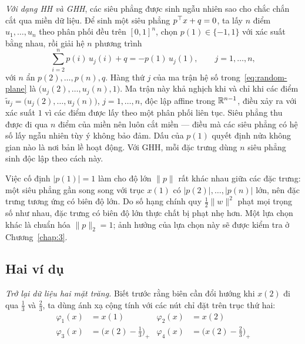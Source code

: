 \emph{Với dạng HH và GHH}, các siêu phẳng được sinh ngẫu nhiên sao cho chắc chắn cắt qua miền dữ liệu. Để sinh một siêu phẳng $p^\top x+q=0$, ta lấy $n$ điểm $u_1,\dots,u_n$ theo phân phối đều trên $[0,1]^n$, chọn $p(1)\in\{-1,1\}$ với xác suất bằng nhau, rồi giải hệ $n$ phương trình
\begin{equation}\label{eq:random-plane}
\sum_{i=2}^{n}p(i)\,u_j(i)+q=-p(1)\,u_j(1),\qquad j=1,\dots,n,
\end{equation}
với $n$ ẩn $p(2),\dots,p(n),q$. Hàng thứ $j$ của ma trận hệ số trong~\eqref{eq:random-plane} là $\bigl(u_j(2),\dots,u_j(n),1\bigr)$. Ma trận này khả nghịch khi và chỉ khi các điểm $\tilde u_j=\bigl(u_j(2),\dots,u_j(n)\bigr)$, $j=1,\dots,n$, độc lập affine trong $\mathbb{R}^{n-1}$, điều xảy ra với xác suất $1$ vì các điểm được lấy theo một phân phối liên tục. Siêu phẳng thu được đi qua $n$ điểm của miền nên luôn cắt miền --- điều mà các siêu phẳng có hệ số lấy ngẫu nhiên tùy ý không bảo đảm. Dấu của $p(1)$ quyết định nửa không gian nào là nơi bản lề hoạt động. Với GHH, mỗi đặc trưng dùng $n$ siêu phẳng sinh độc lập theo cách này.

\begin{remark}\label{rem:scale}
Việc cố định $|p(1)|=1$ làm cho độ lớn $\|p\|$ rất khác nhau giữa các đặc trưng: một siêu phẳng gần song song với trục $x(1)$ có $|p(2)|,\dots,|p(n)|$ lớn, nên đặc trưng tương ứng có biên độ lớn. Do số hạng chính quy $\frac12\|w\|^2$ phạt mọi trọng số như nhau, đặc trưng có biên độ lớn thực chất bị phạt nhẹ hơn. Một lựa chọn khác là chuẩn hóa $\|p\|_2=1$; ảnh hưởng của lựa chọn này sẽ được kiểm tra ở Chương~\ref{chap:3}.
\end{remark}

\subsection{Hai ví dụ}

\emph{Trở lại dữ liệu hai mặt trăng.} Biết trước rằng biên cần đổi hướng khi $x(2)$ đi qua $\tfrac13$ và $\tfrac23$, ta dùng ánh xạ cộng tính với các nút chỉ đặt trên trục thứ hai:
\begin{align*}
\varphi_1(x) &= x(1) &
\varphi_2(x) &= x(2)\\
\varphi_3(x) &= \bigl(x(2)-\tfrac13\bigr)_+ &
\varphi_4(x) &= \bigl(x(2)-\tfrac23\bigr)_+ 
\end{align*}

